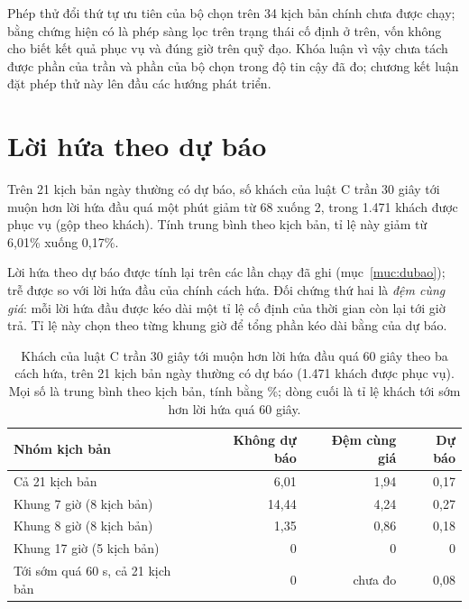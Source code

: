 Phép thử đổi thứ tự ưu tiên của bộ chọn trên 34 kịch bản chính chưa được chạy; bằng chứng hiện có là phép sàng lọc
trên trạng thái cố định ở trên, vốn không cho biết kết quả phục vụ và đúng giờ trên quỹ đạo. Khóa luận vì vậy chưa
tách được phần của trần và phần của bộ chọn trong độ tin cậy đã đo; chương kết luận đặt phép thử này lên đầu các hướng
phát triển.

\section{Lời hứa theo dự báo}
\label{muc:c4-dubao}

Trên 21 kịch bản ngày thường có dự báo, số khách của luật C trần 30 giây tới muộn hơn lời hứa đầu quá một phút
giảm từ 68 xuống 2, trong 1.471 khách được phục vụ (gộp theo khách). Tính trung bình theo kịch bản, tỉ lệ này giảm
từ 6,01\% xuống 0,17\%.

Lời hứa theo dự báo được tính lại trên các lần chạy đã ghi (mục~\ref{muc:dubao}); trễ được so với lời hứa đầu của
chính cách hứa. Đối chứng thứ hai là \emph{đệm cùng giá}: mỗi lời hứa đầu được kéo dài một tỉ lệ cố định của thời
gian còn lại tới giờ trả. Tỉ lệ này chọn theo từng khung giờ để tổng phần kéo dài bằng của dự báo.

\begin{table}[htbp]
\centering
\caption{Khách của luật C trần 30 giây tới muộn hơn lời hứa đầu quá 60 giây theo ba cách hứa, trên 21 kịch bản
ngày thường có dự báo (1.471 khách được phục vụ). Mọi số là trung bình theo kịch bản, tính bằng \%; dòng cuối là
tỉ lệ khách tới sớm hơn lời hứa quá 60 giây.}
\label{bang:c4-dubao}
\small
\begin{tabular}{@{}lrrr@{}}
\toprule
\textbf{Nhóm kịch bản} & \textbf{Không dự báo} & \textbf{Đệm cùng giá} & \textbf{Dự báo}\\
\midrule
Cả 21 kịch bản & 6,01 & 1,94 & 0,17\\
Khung 7 giờ (8 kịch bản) & 14,44 & 4,24 & 0,27\\
Khung 8 giờ (8 kịch bản) & 1,35 & 0,86 & 0,18\\
Khung 17 giờ (5 kịch bản) & 0 & 0 & 0\\
\midrule
Tới sớm quá 60 s, cả 21 kịch bản & 0 & chưa đo & 0,08\\
\bottomrule
\end{tabular}
\end{table}

